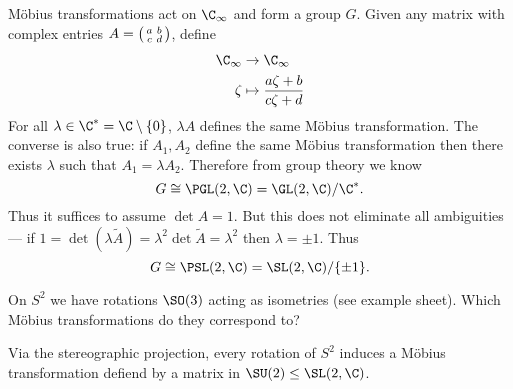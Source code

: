 \documentclass[a4paper]{article}
\theoremstyle{definition}
\begin{document}
Möbius transformations act on \(\C_\infty\) and form a group \(G\). Given any matrix with complex entries \(A = \begin{psmallmatrix} a & b \\ c & d \end{psmallmatrix}\), define
\begin{align*}
  \C_\infty &\to \C_\infty \\
  \zeta &\mapsto \frac{a\zeta + b}{c\zeta + d}
\end{align*}
For all \(\lambda \in \C^* = \C \setminus \{0\}\), \(\lambda A\) defines the same Möbius transformation. The converse is also true: if \(A_1, A_2\) define the same Möbius transformation then there exists \(\lambda\) such that \(A_1 = \lambda A_2\). Therefore from group theory we know
\[
  G \cong \PGL(2, \C) = \GL(2, \C)/\C^*.
\]
Thus it suffices to assume \(\det A = 1\). But this does not eliminate all ambiguities --- if \(1 = \det(\lambda \tilde A) = \lambda^2 \det \tilde A = \lambda^2\) then \(\lambda = \pm 1\). Thus
\[
  G \cong \PSL(2, \C) = \SL(2, \C)/\{\pm 1\}.
\]

On \(S^2\) we have rotations \(\SO(3)\) acting as isometries (see example sheet). Which Möbius transformations do they correspond to?

\begin{theorem}
  Via the stereographic projection, every rotation of \(S^2\) induces a Möbius transformation defiend by a matrix in \(\SU(2) \leq \SL(2, \C)\).
\end{theorem}
\end{document}

